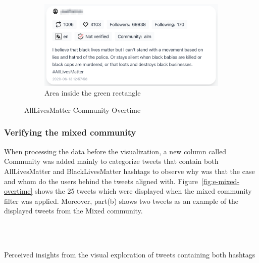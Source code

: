 \begin{figure}[H]
\begin{subfigure}{.5\textwidth}
  \\\
  
  \includegraphics[width=1\linewidth]{Report-latex/tex_files/pics/example/obser7.png}
 \caption{Area inside the green rectangle}
  \label{fig:sub-fourth}
\end{subfigure}

\captionsetup{justification=centering}
\caption{AllLivesMatter Community Overtime}
\label{fig:e-alm-overtime}
\end{figure}


\subsubsection{Verifying the mixed community}

When processing the data before the visualization, a new column called Community was added mainly to categorize tweets that contain both AllLivesMatter and BlackLivesMatter hashtags to observe why was that the case and whom do the users behind the tweets aligned with. Figure~\ref{fig:e-mixed-overtime} shows the 25 tweets which were displayed when the mixed community filter was applied. Moreover, part(b) shows two tweets as an example of the displayed tweets from the Mixed community. 

\\\

Perceived insights from the visual exploration of tweets containing both hashtags

